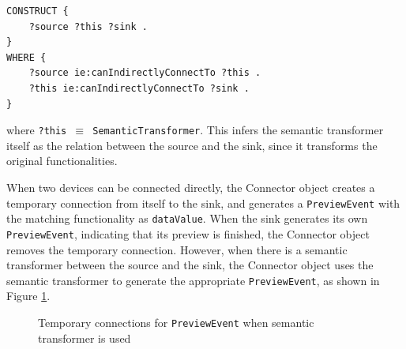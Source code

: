 \begin{verbatim}
CONSTRUCT {
    ?source ?this ?sink .
}
WHERE {
    ?source ie:canIndirectlyConnectTo ?this .
    ?this ie:canIndirectlyConnectTo ?sink .
}
\end{verbatim}

where \texttt{?this \ensuremath{\equiv} SemanticTransformer}. This infers the semantic transformer itself as the relation between the source and the sink, since it transforms the original functionalities.

When two devices can be connected directly, the Connector object creates a temporary connection from itself to the sink, and generates a \texttt{PreviewEvent} with the matching functionality as \texttt{dataValue}. When the sink generates its own \texttt{PreviewEvent}, indicating that its preview is finished, the Connector object removes the temporary connection. However, when there is a semantic transformer between the source and the sink, the Connector object uses the semantic transformer to generate the appropriate \texttt{PreviewEvent}, as shown in Figure \ref{stPreview}.

\begin{figure}[bth]
	\caption{Temporary connections for \texttt{PreviewEvent} when semantic transformer is used}
	\label{stPreview}        
\end{figure}

